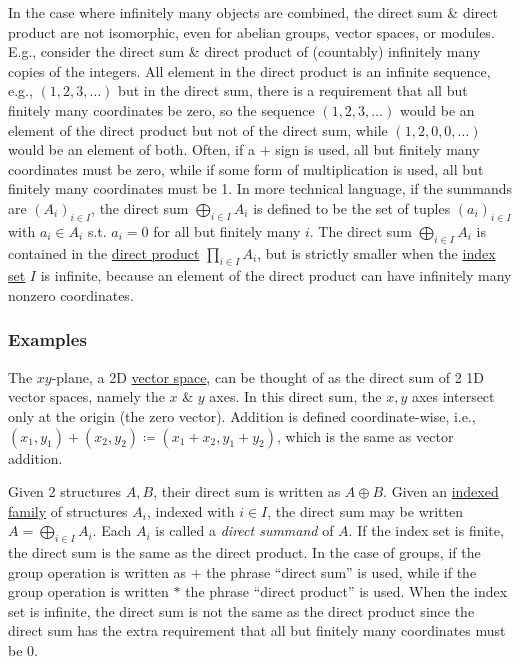 \documentclass{article}
\begin{document}
In the case where infinitely many objects are combined, the direct sum \& direct product are not isomorphic, even for abelian groups, vector spaces, or modules. E.g., consider the direct sum \& direct product of (countably) infinitely many copies of the integers. All element in the direct product is an infinite sequence, e.g., $(1,2,3,\ldots)$ but in the direct sum, there is a requirement that all but finitely many coordinates be zero, so the sequence $(1,2,3,\ldots)$ would be an element of the direct product but not of the direct sum, while $(1,2,0,0,\ldots)$ would be an element of both. Often, if a $+$ sign is used, all but finitely many coordinates must be zero, while if some form of multiplication is used, all but finitely many coordinates must be 1. In more technical language, if the summands are $(A_i) _{i\in I}$, the direct sum $\bigoplus_{i\in I} A_i$ is defined to be the set of tuples $(a_i)_{i\in I}$ with $a_i\in A_i$ s.t. $a_i = 0$ for all but finitely many $i$. The direct sum $\bigoplus_{i\in I} A_i$ is contained in the \href{https://en.wikipedia.org/wiki/Direct_product}{direct product} $\prod_{i\in I} A_i$, but is strictly smaller when the \href{https://en.wikipedia.org/wiki/Index_set}{index set} $I$ is infinite, because an element of the direct product can have infinitely many nonzero coordinates.

\subsubsection{Examples}
The $xy$-plane, a 2D \href{https://en.wikipedia.org/wiki/Vector_space}{vector space}, can be thought of as the direct sum of 2 1D vector spaces, namely the $x$ \& $y$ axes. In this direct sum, the $x,y$ axes intersect only at the origin (the zero vector). Addition is defined coordinate-wise, i.e., $(x_1,y_1) + (x_2,y_2)\coloneqq(x_1 + x_2,y_1 + y_2)$, which is the same as vector addition.

Given 2 structures $A,B$, their direct sum is written as $A\oplus B$. Given an \href{https://en.wikipedia.org/wiki/Indexed_family}{indexed family} of structures $A_i$, indexed with $i\in I$, the direct sum may be written $A = \bigoplus_{i\in I} A_i$. Each $A_i$ is called a {\it direct summand} of $A$. If the index set is finite, the direct sum is the same as the direct product. In the case of groups, if the group operation is written as $+$ the phrase ``direct sum'' is used, while if the group operation is written $*$ the phrase ``direct product'' is used. When the index set is infinite, the direct sum is not the same as the direct product since the direct sum has the extra requirement that all but finitely many coordinates must be 0.
\end{document}

